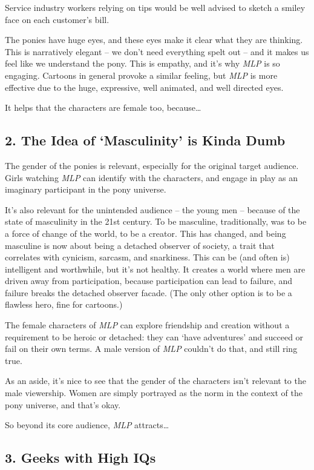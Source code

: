 Service industry workers relying on tips would be well advised to sketch a smiley face on each customer's bill.

The ponies have huge eyes, and these eyes make it clear what they are thinking. This is narratively elegant -- we don't need everything spelt out -- and it makes us feel like we understand the pony. This is empathy, and it's why \textit{MLP} is so engaging. Cartoons in general provoke a similar feeling, but \textit{MLP} is more effective due to the huge, expressive, well animated, and well directed eyes.

It helps that the characters are female too, because…

\subsection*{2. The Idea of `Masculinity' is Kinda Dumb}

The gender of the ponies is relevant, especially for the original target audience. Girls watching \textit{MLP} can identify with the characters, and engage in play as an imaginary participant in the pony universe.

It's also relevant for the unintended audience -- the young men -- because of the state of masculinity in the 21st century. To be masculine, traditionally, was to be a force of change of the world, to be a creator. This has changed, and being masculine is now about being a detached observer of society, a trait that correlates with cynicism, sarcasm, and snarkiness. This can be (and often is) intelligent and worthwhile, but it's not healthy. It creates a world where men are driven away from participation, because participation can lead to failure, and failure breaks the detached observer facade. (The only other option is to be a flawless hero, fine for cartoons.)

The female characters of \textit{MLP} can explore friendship and creation without a requirement to be heroic or detached: they can `have adventures' and succeed or fail on their own terms. A male version of \textit{MLP} couldn't do that, and still ring true.

As an aside, it's nice to see that the gender of the characters isn't relevant to the male viewership. Women are simply portrayed as the norm in the context of the pony universe, and that's okay.

So beyond its core audience, \textit{MLP} attracts…

\subsection*{3. Geeks with High IQs}

